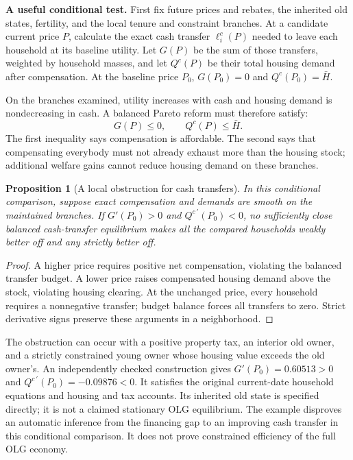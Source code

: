 \documentclass[11pt]{article}
\newtheorem{proposition}{Proposition}
\begin{document}
\textbf{A useful conditional test.} First fix future prices and rebates, the
inherited old states, fertility, and the local tenure and constraint branches.
At a candidate current price $P$, calculate the exact cash transfer
$\ell_i^c(P)$ needed to leave each household at its baseline utility. Let $G(P)$
be the sum of those transfers, weighted by household masses, and let $Q^c(P)$
be their total housing demand after compensation. At the baseline price $P_0$,
$G(P_0)=0$ and $Q^c(P_0)=\bar H$.

On the branches examined, utility increases with cash and housing demand is
nondecreasing in cash. A balanced Pareto reform must therefore satisfy:
\begin{equation}
 G(P)\leq0,\qquad Q^c(P)\leq\bar H.
\end{equation}
The first inequality says compensation is affordable. The second says that
compensating everybody must not already exhaust more than the housing stock;
additional welfare gains cannot reduce housing demand on these branches.

\begin{proposition}[A local obstruction for cash transfers]
In this conditional comparison, suppose exact compensation and demands are
smooth on the maintained branches. If $G'(P_0)>0$ and
$Q^{c\,\prime}(P_0)<0$, no sufficiently close balanced cash-transfer equilibrium
makes all the compared households weakly better off and any strictly better off.
\end{proposition}

\begin{proof}
A higher price requires positive net compensation, violating the balanced
transfer budget. A lower price raises compensated housing demand above the
stock, violating housing clearing. At the unchanged price, every household
requires a nonnegative transfer; budget balance forces all transfers to zero.
Strict derivative signs preserve these arguments in a neighborhood.
\end{proof}

The obstruction can occur with a positive property tax, an interior old owner,
and a strictly constrained young owner whose housing value exceeds the old
owner's. An independently checked construction gives
$G'(P_0)=0.60513>0$ and $Q^{c\,\prime}(P_0)=-0.09876<0$.
It satisfies the original current-date household equations and housing and tax
accounts. Its inherited old state is specified directly; it is not a claimed
stationary OLG equilibrium. The example disproves an automatic inference from
the financing gap to an improving cash transfer in this conditional comparison.
It does not prove constrained efficiency of the full OLG economy.
\end{document}
